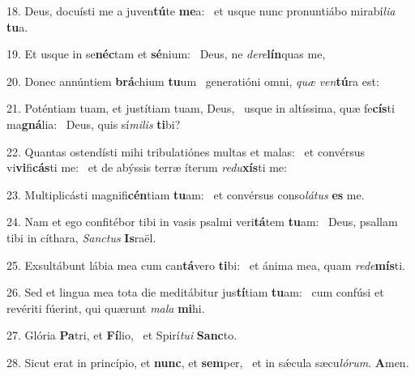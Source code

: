 18. Deus, docuísti me a juven\textbf{tú}te \textbf{me}a: \ast\  et usque nunc pronuntiábo mirabí\textit{li}\textit{a} \textbf{tu}a.\

19. Et usque in se\textbf{néc}tam et \textbf{sé}nium: \ast\  Deus, ne \textit{de}\textit{re}\textbf{lín}quas me,\

20. Donec annúntiem \textbf{brá}chium \textbf{tu}um \ast\  generatióni omni, \textit{quæ} \textit{ven}\textbf{tú}ra est:\

21. Poténtiam tuam, et justítiam tuam, Deus, \dag\  usque in altíssima, quæ fe\textbf{cís}ti ma\textbf{gná}lia: \ast\  Deus, quis sí\textit{mi}\textit{lis} \textbf{ti}bi?\

22. Quantas ostendísti mihi tribulatiónes multas et malas: \dag\  et convérsus vi\textbf{vi}fi\textbf{cás}ti me: \ast\  et de abýssis terræ íterum \textit{re}\textit{du}\textbf{xís}ti me:\

23. Multiplicásti magnifi\textbf{cén}tiam \textbf{tu}am: \ast\  et convérsus conso\textit{lá}\textit{tus} \textbf{es} me.\

24. Nam et ego confitébor tibi in vasis psalmi veri\textbf{tá}tem \textbf{tu}am: \ast\  Deus, psallam tibi in cíthara, \textit{Sanc}\textit{tus} \textbf{Is}raël.\

25. Exsultábunt lábia mea cum can\textbf{tá}vero \textbf{ti}bi: \ast\  et ánima mea, quam \textit{red}\textit{e}\textbf{mís}ti.\

26. Sed et lingua mea tota die meditábitur jus\textbf{tí}tiam \textbf{tu}am: \ast\  cum confúsi et revériti fúerint, qui quærunt \textit{ma}\textit{la} \textbf{mi}hi.\

27. Glória \textbf{Pa}tri, et \textbf{Fí}lio, \ast\  et Spirí\textit{tu}\textit{i} \textbf{Sanc}to.\

28. Sicut erat in princípio, et \textbf{nunc}, et \textbf{sem}per, \ast\  et in sǽcula sæcu\textit{ló}\textit{rum}. \textbf{A}men.\


